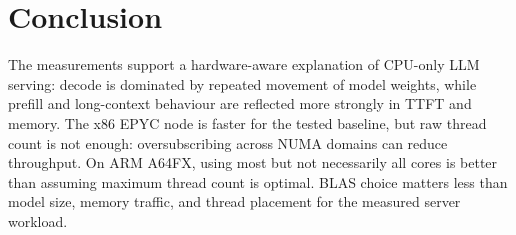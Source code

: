 \documentclass[11pt,a4paper]{article}
\begin{document}
\section{Conclusion}

The measurements support a hardware-aware explanation of CPU-only LLM serving:
decode is dominated by repeated movement of model weights, while prefill and
long-context behaviour are reflected more strongly in TTFT and memory. The x86
EPYC node is faster for the tested baseline, but raw thread count is not enough:
oversubscribing across NUMA domains can reduce throughput. On ARM A64FX, using
most but not necessarily all cores is better than assuming maximum thread count
is optimal. BLAS choice matters less than model size, memory traffic, and
thread placement for the measured server workload.
\end{document}
